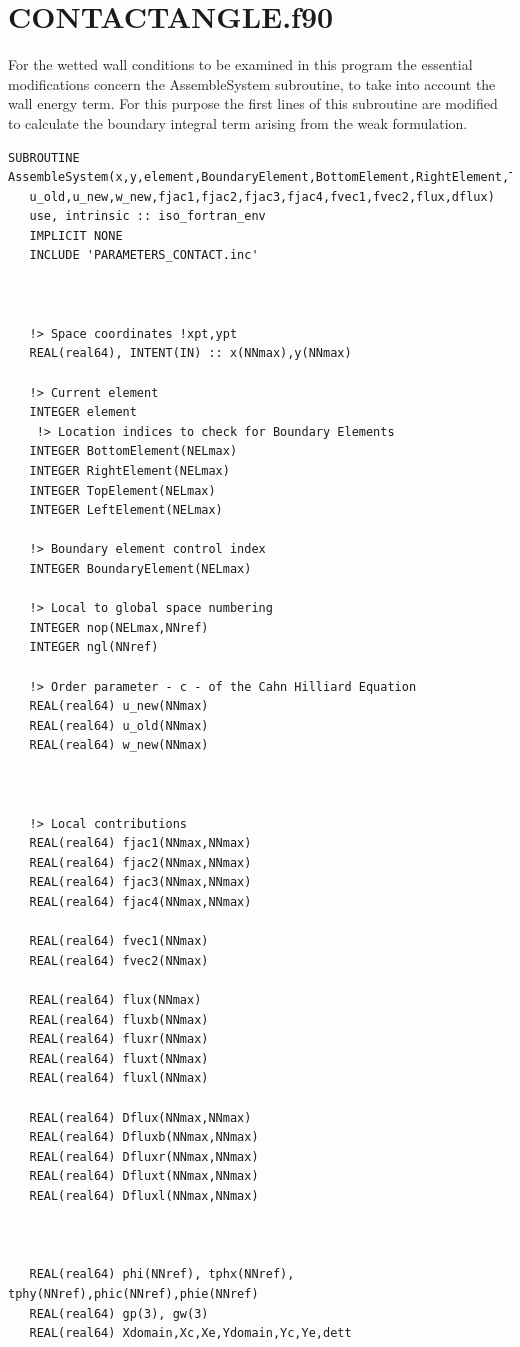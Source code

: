 \documentclass{article}
\begin{document}
\section{CONTACTANGLE.f90}
For the wetted wall conditions to be examined in this program the essential modifications concern the AssembleSystem subroutine, to take into account the wall energy term. For this purpose the first lines of this subroutine are modified to calculate the boundary integral term arising from the weak formulation.
\begin{verbatim}
SUBROUTINE AssembleSystem(x,y,element,BoundaryElement,BottomElement,RightElement,TopElement,LeftElement,nop,&
   u_old,u_new,w_new,fjac1,fjac2,fjac3,fjac4,fvec1,fvec2,flux,dflux)
   use, intrinsic :: iso_fortran_env
   IMPLICIT NONE
   INCLUDE 'PARAMETERS_CONTACT.inc'



   !> Space coordinates !xpt,ypt
   REAL(real64), INTENT(IN) :: x(NNmax),y(NNmax)

   !> Current element
   INTEGER element
    !> Location indices to check for Boundary Elements
   INTEGER BottomElement(NELmax)
   INTEGER RightElement(NELmax)
   INTEGER TopElement(NELmax)
   INTEGER LeftElement(NELmax)

   !> Boundary element control index
   INTEGER BoundaryElement(NELmax)

   !> Local to global space numbering
   INTEGER nop(NELmax,NNref)
   INTEGER ngl(NNref)

   !> Order parameter - c - of the Cahn Hilliard Equation
   REAL(real64) u_new(NNmax)
   REAL(real64) u_old(NNmax)
   REAL(real64) w_new(NNmax)
 

 
   !> Local contributions
   REAL(real64) fjac1(NNmax,NNmax)
   REAL(real64) fjac2(NNmax,NNmax)
   REAL(real64) fjac3(NNmax,NNmax)
   REAL(real64) fjac4(NNmax,NNmax)
   
   REAL(real64) fvec1(NNmax)
   REAL(real64) fvec2(NNmax)

   REAL(real64) flux(NNmax)
   REAL(real64) fluxb(NNmax)
   REAL(real64) fluxr(NNmax)
   REAL(real64) fluxt(NNmax)
   REAL(real64) fluxl(NNmax)

   REAL(real64) Dflux(NNmax,NNmax)
   REAL(real64) Dfluxb(NNmax,NNmax)
   REAL(real64) Dfluxr(NNmax,NNmax)
   REAL(real64) Dfluxt(NNmax,NNmax)
   REAL(real64) Dfluxl(NNmax,NNmax)



   REAL(real64) phi(NNref), tphx(NNref), tphy(NNref),phic(NNref),phie(NNref)
   REAL(real64) gp(3), gw(3)
   REAL(real64) Xdomain,Xc,Xe,Ydomain,Yc,Ye,dett


\end{verbatim}
\end{document}
